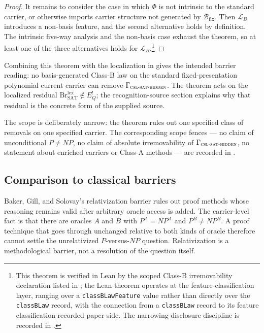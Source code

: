 \documentclass[11pt]{article}
\newcommand{\EQbang}{E^{!}_{Q}}
\newcommand{\CSLSATHidden}{\Gamma_{\textsc{csl-sat-hidden}}}
\theoremstyle{definition}
\begin{document}
\begin{proof}
It remains to consider the case in which \(\Phi\) is not intrinsic to
the standard carrier, or otherwise imports carrier structure not
generated by \(\mathcal B_{\mathrm{fix}}\).  Then
\(\mathcal L_B\) introduces a non-basis feature, and the second
alternative holds by definition.  The intrinsic five-way analysis and
the non-basis case exhaust the theorem, so at least one of the three
alternatives holds for \(\mathcal L_B\).\footnote{This theorem is
verified in Lean by the scoped Class-B irremovability declaration listed in
; the Lean theorem operates at the
feature-classification layer, ranging over a \texttt{classBLawFeature}
value rather than directly over the \texttt{classBLaw} record, with the
connection from a
\texttt{classBLaw} record to its feature classification recorded
paper-side.  The narrowing-disclosure discipline is recorded in
.}
\end{proof}

Combining this theorem with the localization in
 gives the intended barrier reading: no
basis-generated Class-B law on the standard fixed-presentation
polynomial current carrier can remove \(\CSLSATHidden\).  The theorem
acts on the localized residual
\(\mathrm{Br}^{\mathrm{lex}}_{\mathrm{SAT}}\notin\EQbang\); the
recognition-source section explains why that residual is the concrete
form of the supplied source.

The scope is deliberately narrow: the theorem rules out one specified
class of removals on one specified carrier.  The corresponding scope
fences — no claim of unconditional \(P\neq NP\), no claim of absolute
irremovability of \(\CSLSATHidden\), no statement about enriched
carriers or Class-A methods — are recorded in .

\subsection{Comparison to classical barriers}
\label{subsec:class-b:comparison}

Baker, Gill, and Solovay's relativization barrier
\citep{BakerGillSolovay1975Relativization} rules out proof methods
whose reasoning remains valid after arbitrary oracle access is added.
The carrier-level fact is that there are oracles \(A\) and \(B\) with
\(P^A=NP^A\) and \(P^B\neq NP^B\).  A proof technique that goes
through unchanged relative to both kinds of oracle therefore cannot
settle the unrelativized \(P\)-versus-\(NP\) question.  Relativization
is a methodological barrier, not a resolution of the question itself.
\end{document}
